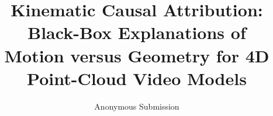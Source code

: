 \documentclass[letterpaper]{article} %
\title{Kinematic Causal Attribution: Black-Box Explanations of\\Motion versus Geometry for 4D Point-Cloud Video Models}
\author{Anonymous Submission}
\begin{document}
\maketitle






\label{maintext-end}%




\end{document}

